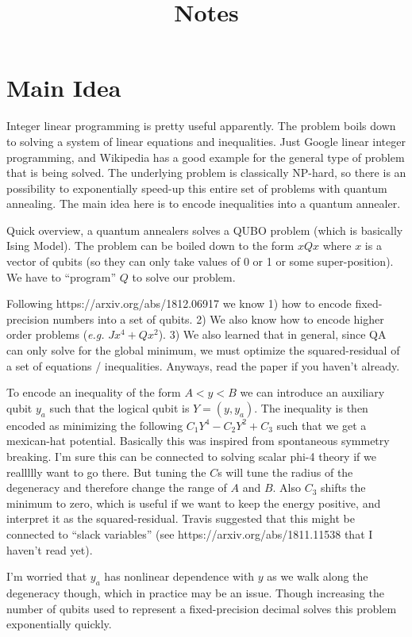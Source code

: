 \documentclass[]{article}
\title{Notes}
\begin{document}
\maketitle

\section{Main Idea}

Integer linear programming is pretty useful apparently. The problem boils down to solving a system of linear equations and inequalities. Just Google linear integer programming, and Wikipedia has a good example for the general type of problem that is being solved. The underlying problem is classically NP-hard, so there is an possibility to exponentially speed-up this entire set of problems with quantum annealing. The main idea here is to encode inequalities into a quantum annealer.

Quick overview, a quantum annealers solves a QUBO problem (which is basically Ising Model). The problem can be boiled down to the form $x Q x$ where $x$ is a vector of qubits (so they can only take values of 0 or 1 or some super-position). We have to ``program'' $Q$ to solve our problem.

Following https://arxiv.org/abs/1812.06917 we know 1) how to encode fixed-precision numbers into a set of qubits. 2) We also know how to encode higher order problems (\textit{e.g.} $J x^4 + Q x^2$). 3)  We also learned that in general, since QA can only solve for the global minimum, we must optimize the squared-residual of a set of equations / inequalities. Anyways, read the paper if you haven't already.

To encode an inequality of the form $A < y < B$ we can introduce an auxiliary qubit $y_a$ such that the logical qubit is $Y = (y, y_a)$. The inequality is then encoded as minimizing the following $C_1 Y^4 - C_2 Y^2 + C_3$ such that we get a mexican-hat potential. Basically this was inspired from spontaneous symmetry breaking. I'm sure this can be connected to solving scalar phi-4 theory if we reallllly want to go there. But tuning the $C$s will tune the radius of the degeneracy and therefore change the range of $A$ and $B$.  Also $C_3$ shifts the minimum to zero, which is useful if we want to keep the energy positive, and interpret it as the squared-residual. Travis suggested that this might be connected to ``slack variables'' (see https://arxiv.org/abs/1811.11538 that I haven't read yet).

I'm worried that $y_a$ has nonlinear dependence with $y$ as we walk along the degeneracy though, which in practice may be an issue. Though increasing the number of qubits used to represent a fixed-precision decimal solves this problem exponentially quickly.
\end{document}
